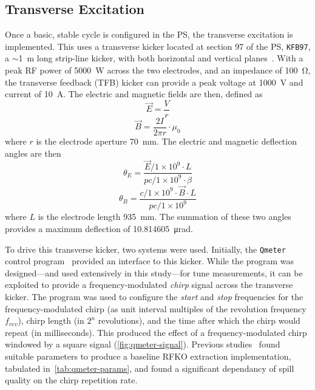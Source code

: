 \documentclass[11pt]{report}
\begin{document}
\subsection{Transverse Excitation}\label{sec:trans_exc}
Once a basic, stable cycle is configured in the PS, the transverse excitation is implemented. This uses a transverse kicker located at section 97 of the PS, \verb|KFB97|, a $\sim$\qty{1}{\meter} long strip-line kicker, with both horizontal and vertical planes~\cite{Sterbini:2158994}. With a peak RF power of \qty{5000}{\watt} across the two electrodes, and an impedance of \qty{100}{\ohm}, the transverse feedback (TFB) kicker can provide a peak voltage at \qty{1000}{\volt} and current of \qty{10}{\ampere}. The electric and magnetic fields are then, defined as
\begin{equation}
  \vec E=\frac Vr
\end{equation}
\begin{equation}
  \vec B=\frac {2I}{2\pi r}\cdot \mu_0
\end{equation}
where $r$ is the electrode aperture \qty{70}{\milli\meter}. The electric and magnetic deflection angles are then~\cite[3.1-3.2]{bouvet}
\begin{equation}
  \theta_E = \frac{\vec E / 1\times10^9\cdot L}{pc/1\times10^9 \cdot\beta}
  \label{eq:kick-electric}
\end{equation}
\begin{equation}
  \theta_B = \frac{c/1\times10^9\cdot \vec B\cdot L}{pc/1\times10^9}
  \label{eq:kick-magnetic}
\end{equation} where $L$ is the electrode length \qty{935}{\milli\meter}.
The summation of these two angles provides a maximum deflection of \qty{10.814605}{\micro\radian}.

To drive this transverse kicker, two systems were used. Initially, the \verb|Qmeter| control program~\cite{Gasior:895142} provided an interface to this kicker. While the program was designed---and used extensively in this study---for tune measurements, it can be exploited to provide a frequency-modulated \textit{chirp} signal across the transverse kicker. The program was used to configure the \textit{start} and \textit{stop} frequencies for the frequency-modulated chirp (as unit interval multiples of the revolution frequency $f_{rev}$), chirp length (in $2^n$ revolutions), and the time after which the chirp would repeat (in milliseconds). This produced the effect of a frequency-modulated chirp windowed by a square signal (\autoref{fig:qmeter-signal}). Previous studies~\cite{ipac} found suitable parameters to produce a baseline RFKO extraction implementation, tabulated in~\autoref{tab:qmeter-params}, and found a significant dependancy of spill quality on the chirp repetition rate.
\end{document}
